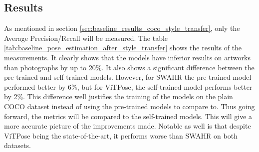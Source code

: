 \subsection{Results}
\label{sec:baseline_human_art_results}
As mentioned in section \ref{sec:baseline_results_coco_style_transfer}, only the Average Precision/Recall will be measured.
The table \ref{tab:baseline_pose_estimation_after_style_transfer} shows the results of the measurements.
It clearly shows that the models have inferior results on artworks than photographs by up to 20\%.
It also shows a significant difference between the pre-trained and self-trained models.
However, for SWAHR the pre-trained model performed better by 6\%, but for ViTPose, the self-trained model performs better by 2\%.
This difference well justifies the training of the models on the plain COCO dataset instead of using the pre-trained models to compare to.
Thus going forward, the metrics will be compared to the self-trained models.
This will give a more accurate picture of the improvements made.
Notable as well is that despite ViTPose being the state-of-the-art, it performs worse than SWAHR on both datasets.

